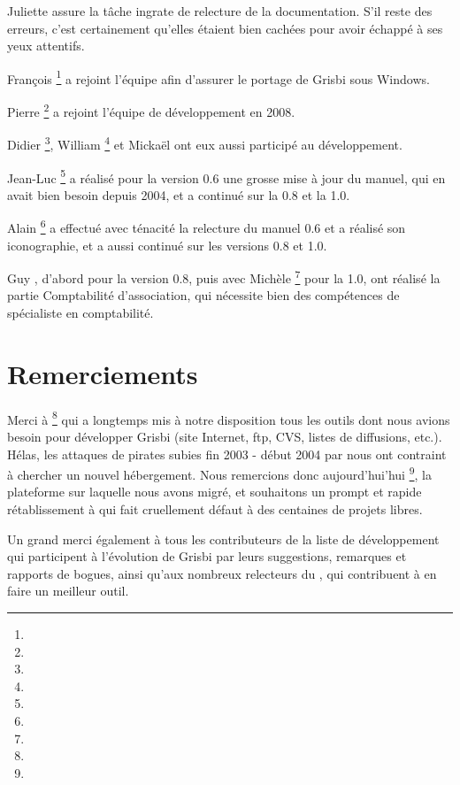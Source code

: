 {Juliette } assure la tâche ingrate de relecture de la documentation. S'il reste des erreurs, c'est certainement qu'elles étaient bien cachées pour avoir échappé à ses yeux
attentifs.

{François }\footnote{\urlFrancoisTerrotEmail{}} a rejoint l'équipe afin d'assurer le \gls{portage} de Grisbi sous Windows.

{Pierre }\footnote{\urlPierreBiavaEmail{}} a rejoint l'équipe de développement en 2008.

{Didier }\footnote{\urlDidierChevalierEmail{}},  {William }\footnote{\urlWilliamOllivierEmail{}} et {Mickaël } ont eux aussi participé au développement.

{Jean-Luc }\footnote{\urlJeanLucDuflotEmail{}} a réalisé pour la version 0.6 une grosse mise à jour du manuel, qui en avait bien besoin depuis 2004, et a continué sur la 0.8 et la 1.0.

{Alain }\footnote{\urlAlainLetientEmail{}} a effectué avec ténacité la relecture du manuel 0.6 et a réalisé son iconographie, et a aussi continué sur les versions 0.8 et 1.0.

{Guy }, d'abord pour la version 0.8, puis avec {Michèle }\footnote{\urlMicheleBondilEmail{}} pour la 1.0, ont réalisé la partie Comptabilité d'association, qui nécessite bien des compétences de spécialiste en comptabilité.


\section{Remerciements\label{introduction-thanks}}


Merci à \footnote{\urlTuxFamily{}} qui a longtemps mis à notre disposition tous les outils dont nous avions besoin pour développer Grisbi
(site Internet, ftp, CVS, listes de diffusions, etc.). Hélas, les attaques
de pirates subies fin 2003 - début 2004 par  nous ont contraint à chercher un nouvel hébergement. Nous remercions donc aujourd'hui'hui \footnote{\urlSourceForge{}}, la plateforme sur laquelle nous avons migré, et souhaitons un prompt et rapide rétablissement à  qui fait cruellement défaut à des centaines de projets libres.

Un grand merci également à tous les contributeurs de la liste de développement qui participent à l'évolution de Grisbi par leurs suggestions, remarques et rapports de bogues, ainsi qu'aux nombreux relecteurs du , qui contribuent à en faire un meilleur outil.


